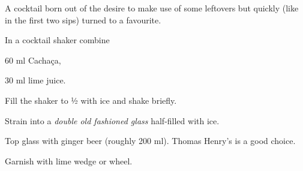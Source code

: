 \startsection[title={Gingergrass Mule},reference=gingergrassmule]
A cocktail born out of the desire to make use of some leftovers but
quickly (like in the first two sips) turned to a favourite.

\startitemize
\item In a cocktail shaker combine
      \startitemize
      \item 60 ml Cachaça,
      \item 30 ml lime juice.
      \stopitemize
\item Fill the shaker to ½ with ice and shake briefly.
\item Strain into a {\em double old fashioned glass} half-filled with ice.
\item Top glass with \tr ginger beer (roughly 200 ml). Thomas Henry's is a good choice.
\item Garnish with \tr lime wedge or wheel.
\stopitemize
\stopsection
